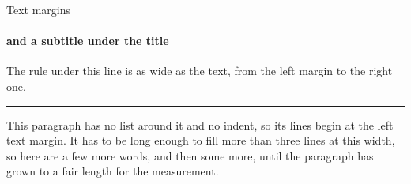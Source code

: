\begin{standardframe}{Text margins}
	\framesubtitle{and a subtitle under the title}
	The rule under this line is as wide as the text, from the left margin to the right one.\par
	\noindent\rule{\linewidth}{0.4pt}\par\smallskip
	\noindent This paragraph has no list around it and no indent, so its lines begin at the left text margin. It has to be long enough to fill more than three lines at this width, so here are a few more words, and then some more, until the paragraph has grown to a fair length for the measurement.
\end{standardframe}
